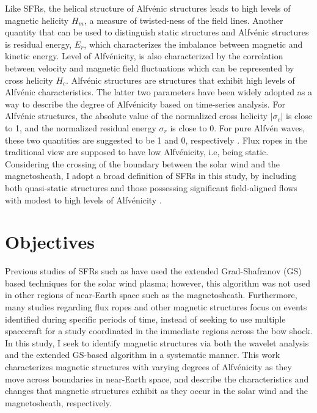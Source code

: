 Like SFRs, the helical structure of Alfv\'enic structures leads to high levels of magnetic helicity $H_m$\footnotemark{}, a measure of twisted-ness of the field lines. Another quantity that can be used to distinguish static structures and Alfv\'enic structures is residual energy, $E_r$\footnotemark[\value{footnote}], which characterizes the imbalance between magnetic and kinetic energy. Level of Alfv\'enicity, is also characterized by the correlation between velocity and magnetic field fluctuations which can be represented by cross helicity $H_c$\footnotemark[\value{footnote}]. Alfv\'enic structures are structures that exhibit high levels of Alfv\'enic characteristics. The latter two parameters have been widely adopted as a way to describe the degree of Alfv\'enicity based on time-series analysis. For Alfv\'enic structures, the absolute value of the normalized cross helicity $|\sigma_c|$ is close to 1, and the normalized residual energy $\sigma_r$ is close to 0. For pure Alfv\'en waves, these two quantities are suggested to be 1 and 0, respectively \citep{Bruno:2013}. Flux ropes in the traditional view are supposed to have low Alfv\'enicity, i.e, being static. Considering the crossing of the boundary between the solar wind and the magnetosheath, I adopt a broad definition of SFRs in this study, by including both quasi-static structures and those possessing significant field-aligned flows with modest to high levels of Alfv\'enicity \citep{Chen:2022}.



\section{Objectives}
Previous studies of SFRs such as \cite{Chen:2022} have used the extended Grad-Shafranov (GS) based techniques for the solar wind plasma; however, this algorithm was not used in other regions of near-Earth space such as the magnetosheath. Furthermore, many studies regarding flux ropes and other magnetic structures \citep{Zhao:2020, Chen:2021} focus on events identified during specific periods of time, instead of seeking to use multiple spacecraft for a study coordinated in the immediate regions across the bow shock. In this study, I seek to identify magnetic structures via both the wavelet analysis and the extended GS-based algorithm in a systematic manner. This work characterizes magnetic structures with varying degrees of Alfv\'enicity as they move across boundaries in near-Earth space, and describe the characteristics and changes that magnetic structures exhibit as they occur in the solar wind and the magnetosheath, respectively.  

